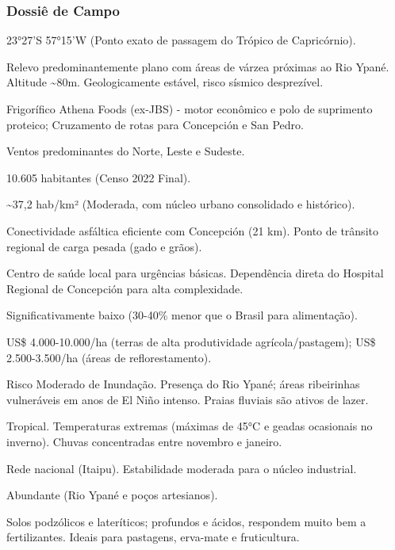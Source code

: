 \subsubsection{Dossiê de Campo}
\begin{description}[style=nextline,leftmargin=0.5cm,font=\bfseries]
\item[Coordenadas]  23°27'S 57°15'W (Ponto exato de passagem do Trópico de Capricórnio).
\item[Topografia]  Relevo predominantemente plano com áreas de várzea próximas ao Rio Ypané. Altitude \textasciitilde 80m. Geologicamente estável, risco sísmico desprezível.
\item[Alvos Estratégicos]  Frigorífico Athena Foods (ex-JBS) - motor econômico e polo de suprimento proteico; Cruzamento de rotas para Concepción e San Pedro.
\item[Fallout]  Ventos predominantes do Norte, Leste e Sudeste.
\item[População]  10.605 habitantes (Censo 2022 Final).
\item[Densidade]  \textasciitilde 37,2 hab/\allowbreak \allowbreak km² (Moderada, com núcleo urbano consolidado e histórico).
\item[Vias de Acesso]  Conectividade asfáltica eficiente com Concepción (21 km). Ponto de trânsito regional de carga pesada (gado e grãos).
\item[Serviços]  Centro de saúde local para urgências básicas. Dependência direta do Hospital Regional de Concepción para alta complexidade.
\item[Custo de Vida]  Significativamente baixo (30-40\% menor que o Brasil para alimentação).
\item[Preço da Terra]  US\$ 4.000-10.000/\allowbreak \allowbreak ha (terras de alta produtividade agrícola/\allowbreak \allowbreak pastagem); US\$ 2.500-3.500/\allowbreak \allowbreak ha (áreas de reflorestamento).
\item[Hidrologia]  Risco Moderado de Inundação. Presença do Rio Ypané; áreas ribeirinhas vulneráveis em anos de El Niño intenso. Praias fluviais são ativos de lazer.
\item[Clima]  Tropical. Temperaturas extremas (máximas de 45°C e geadas ocasionais no inverno). Chuvas concentradas entre novembro e janeiro.
\item[Energia]  Rede nacional (Itaipu). Estabilidade moderada para o núcleo industrial.
\item[Água]  Abundante (Rio Ypané e poços artesianos).
\item[Qualidade do Solo]  Solos podzólicos e lateríticos; profundos e ácidos, respondem muito bem a fertilizantes. Ideais para pastagens, erva-mate e fruticultura.

\end{description}
